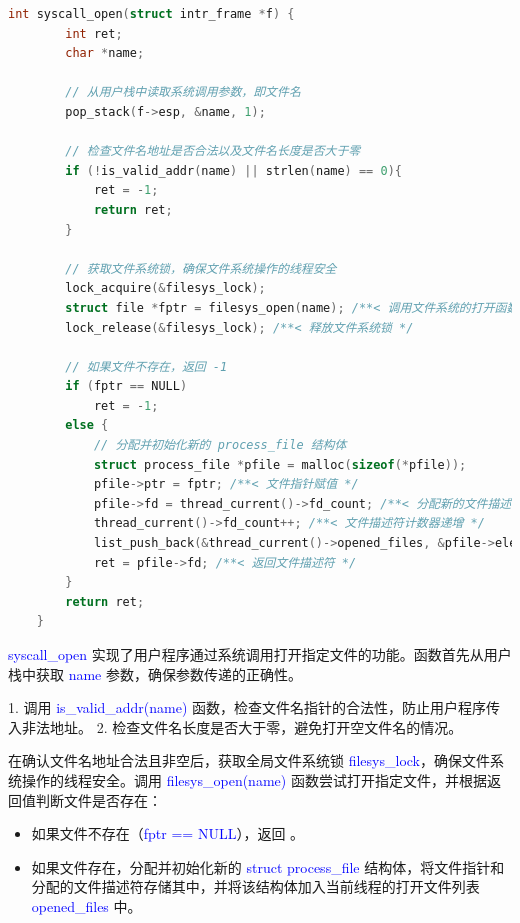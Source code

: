 \documentclass[14pt,a4paper,UTF8,twoside]{article}
\renewcommand{\texttt}[1]{\textcolor{blue}{\ttfamily #1}}
\begin{document}
\begin{lstlisting}[language=C, title= syscall\_open()]
    int syscall_open(struct intr_frame *f) {
        int ret;
        char *name;
    
        // 从用户栈中读取系统调用参数，即文件名
        pop_stack(f->esp, &name, 1);
    
        // 检查文件名地址是否合法以及文件名长度是否大于零
        if (!is_valid_addr(name) || strlen(name) == 0){
            ret = -1;
            return ret;
        }
    
        // 获取文件系统锁，确保文件系统操作的线程安全
        lock_acquire(&filesys_lock);
        struct file *fptr = filesys_open(name); /**< 调用文件系统的打开函数，返回文件指针。 */
        lock_release(&filesys_lock); /**< 释放文件系统锁 */
    
        // 如果文件不存在，返回 -1
        if (fptr == NULL)
            ret = -1;
        else {
            // 分配并初始化新的 process_file 结构体
            struct process_file *pfile = malloc(sizeof(*pfile));
            pfile->ptr = fptr; /**< 文件指针赋值 */
            pfile->fd = thread_current()->fd_count; /**< 分配新的文件描述符 */
            thread_current()->fd_count++; /**< 文件描述符计数器递增 */
            list_push_back(&thread_current()->opened_files, &pfile->elem); /**< 将文件加入当前线程的打开文件列表 */
            ret = pfile->fd; /**< 返回文件描述符 */
        }
        return ret;
    }
\end{lstlisting}
    
\begin{cth}
    
    \texttt{syscall\_open} 实现了用户程序通过系统调用打开指定文件的功能。函数首先从用户栈中获取 \texttt{name} 参数，确保参数传递的正确性。
    
    1. 调用 \texttt{is\_valid\_addr(name)} 函数，检查文件名指针的合法性，防止用户程序传入非法地址。
    2. 检查文件名长度是否大于零，避免打开空文件名的情况。
    
    \vspace{0.3cm}

    在确认文件名地址合法且非空后，获取全局文件系统锁 \texttt{filesys\_lock}，确保文件系统操作的线程安全。调用 \texttt{filesys\_open(name)} 函数尝试打开指定文件，并根据返回值判断文件是否存在：

    \begin{itemize}
        \item 如果文件不存在（\texttt{fptr == NULL}），返回 \texttt{-1}。
        \item 如果文件存在，分配并初始化新的 \texttt{struct process\_file} 结构体，将文件指针和分配的文件描述符存储其中，并将该结构体加入当前线程的打开文件列表 \texttt{opened\_files} 中。
    \end{itemize}
    
\end{cth}
\end{document}

